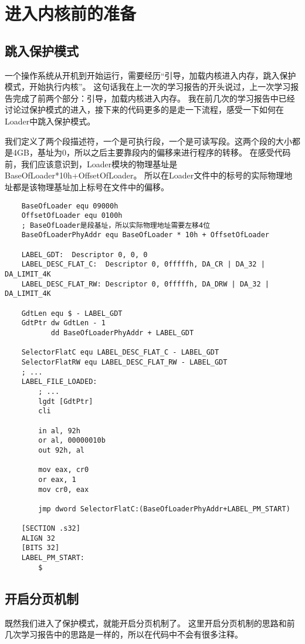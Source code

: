 \documentclass[a4paper,left=2.5cm,right=2.5cm,11pt]{article}
\begin{document}
\tableofcontents

\clearpage

\section{进入内核前的准备}
\subsection{跳入保护模式}
	一个操作系统从开机到开始运行，需要经历“引导，加载内核进入内存，跳入保护模式，开始执行内核”。
	这句话我在上一次的学习报告的开头说过，上一次学习报告完成了前两个部分：引导，加载内核进入内存。
	我在前几次的学习报告中已经讨论过保护模式的进入，接下来的代码更多的是走一下流程，感受一下如何在Loader中跳入保护模式。\par
	我们定义了两个段描述符，一个是可执行段，一个是可读写段。这两个段的大小都是4GB，基址为0，所以之后主要靠段内的偏移来进行程序的转移。
	在感受代码前，我们应该意识到，Loader模块的物理基址是BaseOfLoader*10h+OffsetOfLoader。
	所以在Loader文件中的标号的实际物理地址都是该物理基址加上标号在文件中的偏移。
	\begin{lstlisting}
	BaseOfLoader equ 09000h
	OffsetOfLoader equ 0100h
	; BaseOfLoader是段基址，所以实际物理地址需要左移4位
	BaseOfLoaderPhyAddr equ BaseOfLoader * 10h + OffsetOfLoader

	LABEL_GDT:	Descriptor 0, 0, 0
	LABEL_DESC_FLAT_C:	Descriptor 0, 0fffffh, DA_CR | DA_32 | DA_LIMIT_4K
	LABEL_DESC_FLAT_RW: Descriptor 0, 0fffffh, DA_DRW | DA_32 | DA_LIMIT_4K

	GdtLen equ $ - LABEL_GDT
	GdtPtr dw GdtLen - 1
		   dd BaseOfLoaderPhyAddr + LABEL_GDT
	
	SelectorFlatC equ LABEL_DESC_FLAT_C - LABEL_GDT
	SelectorFlatRW equ LABEL_DESC_FLAT_RW - LABEL_GDT
	; ...
	LABEL_FILE_LOADED:
		; ...
		lgdt [GdtPtr]
		cli

		in al, 92h
		or al, 00000010b
		out 92h, al

		mov eax, cr0
		or eax, 1
		mov cr0, eax

		jmp dword SelectorFlatC:(BaseOfLoaderPhyAddr+LABEL_PM_START)

	[SECTION .s32]
	ALIGN 32
	[BITS 32]
	LABEL_PM_START:
		$
	\end{lstlisting}

\subsection{开启分页机制}
	既然我们进入了保护模式，就能开启分页机制了。
	这里开启分页机制的思路和前几次学习报告中的思路是一样的，所以在代码中不会有很多注释。\par
\end{document}
